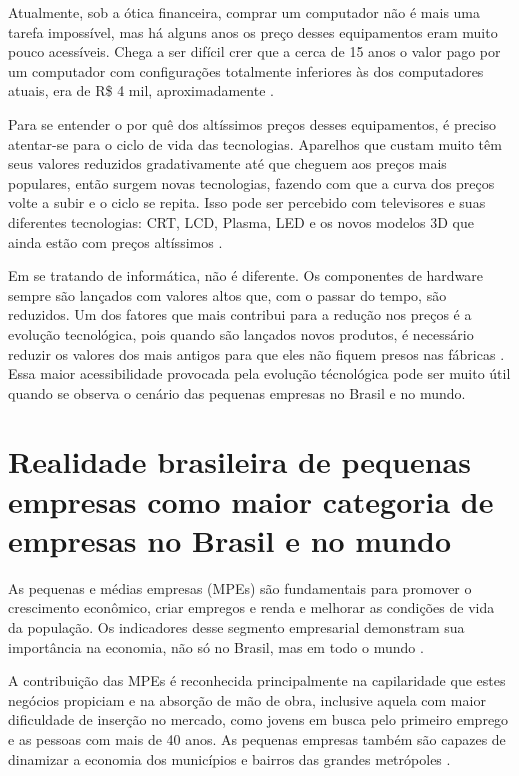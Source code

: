 Atualmente, sob a ótica financeira, comprar um computador não é mais uma tarefa impossível, mas há alguns anos os preço desses equipamentos eram muito pouco acessíveis. Chega a ser difícil crer que a cerca de 15 anos o valor pago por um computador com configurações totalmente inferiores às dos computadores atuais, era de R\$ 4 mil, aproximadamente \cite{HAMANN}.

Para se entender o por quê dos altíssimos preços desses equipamentos, é preciso atentar-se para o ciclo de vida das tecnologias. Aparelhos que custam muito têm seus valores reduzidos gradativamente até que cheguem aos preços mais populares, então surgem novas tecnologias, fazendo com que a curva dos preços volte a subir e o ciclo se repita. Isso pode ser percebido com televisores e suas diferentes tecnologias: CRT, LCD, Plasma, LED e os novos modelos 3D que ainda estão com preços altíssimos \cite{HAMANN}.

Em se tratando de informática, não é diferente. Os componentes de hardware sempre são lançados com valores altos que, com o passar do tempo, são reduzidos. Um dos fatores que mais contribui para a redução nos preços é a evolução tecnológica, pois quando são lançados novos produtos, é necessário reduzir os valores dos mais antigos para que eles não fiquem presos nas fábricas \cite{HAMANN}. Essa maior acessibilidade provocada pela evolução técnológica pode ser muito útil quando se observa o cenário das pequenas empresas no Brasil e no mundo.

\section{Realidade brasileira de pequenas empresas como maior categoria de empresas no Brasil e no mundo}

As pequenas e médias empresas (MPEs) são fundamentais para promover o crescimento econômico, criar empregos e renda e melhorar as condições de vida da população. Os indicadores desse segmento empresarial demonstram sua importância na economia, não só no Brasil, mas em todo o mundo \cite{PORTALBRASIL}.

A contribuição das MPEs é reconhecida principalmente na capilaridade que estes negócios propiciam e na absorção de mão de obra, inclusive aquela com maior dificuldade de inserção no mercado, como jovens em busca pelo primeiro emprego e as pessoas com mais de 40 anos. As pequenas empresas também são capazes de dinamizar a economia dos municípios e bairros das grandes metrópoles \cite{PORTALBRASIL}.

